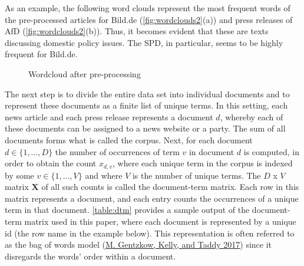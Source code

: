 \documentclass[
  12pt,
]{article}
\begin{document}
As an example, the following word clouds represent the most frequent
words of the pre-processed articles for Bild.de
(\autoref{fig:wordclouds2}(a)) and press releases of AfD
(\autoref{fig:wordclouds2}(b)). Thus, it becomes evident that these are
texts discussing domestic policy issues. The SPD, in particular, seems
to be highly frequent for Bild.de.

\begin{figure}

{\centering {}

}

\caption{Wordcloud after pre-processing \label{fig:wordclouds2}}\label{fig:wordclouds2}
\end{figure}

The next step is to divide the entire data set into individual documents
and to represent these documents as a finite list of unique terms. In
this setting, each news article and each press release represents a
document \(d\), whereby each of these documents can be assigned to a
news website or a party. The sum of all documents forms what is called
the corpus. Next, for each document \(d \in \lbrace 1,...,D \rbrace\)
the number of occurrences of term \(v\) in document \(d\) is computed,
in order to obtain the count \(x_{d,v}\), where each unique term in the
corpus is indexed by some \(v \in \lbrace 1,...,V \rbrace\) and where
\(V\) is the number of unique terms. The \(D\) x \(V\) matrix
\(\boldsymbol{X}\) of all such counts is called the document-term
matrix. Each row in this matrix represents a document, and each entry
counts the occurrences of a unique term in that document.
\autoref{table:dtm} provides a sample output of the document-term matrix
used in this paper, where each document is represented by a unique id
(the row name in the example below). This representation is often
referred to as the bag of words model
(\protect\hyperlink{ref-gentzkow_text_2017}{M. Gentzkow, Kelly, and
Taddy 2017}) since it disregards the words' order within a document.
\end{document}
